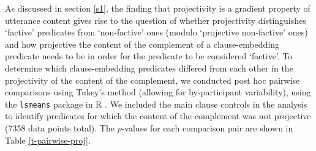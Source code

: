 \documentclass[11pt,fleqn]{article}
\newcommand{\6}{\mbox{$[\hspace*{-.6mm}[$}}
\newcommand{\9}{\mbox{$]\hspace*{-.6mm}]$}}
\begin{document}

As discussed in section \ref{s1}, the finding that projectivity is a gradient property of utterance content gives rise to the question of whether projectivity distinguishes `factive' predicates from `non-factive' ones (modulo `projective non-factive' ones) and how projective the content of the complement of a clause-embedding predicate needs to be in order for the predicate to be considered `factive'. To determine which clause-embedding predicates differed from each other in the projectivity of the content of the  complement, we conducted post hoc pairwise comparisons using Tukey's method (allowing for by-participant variability), using the \verb|lsmeans| package \citep{tukey} in R \citep{r}. We included the main clause controls in the analysis to identify predicates for which the content of the complement was not projective (7358 data points total). The $p$-values for each comparison pair are shown in Table \ref{t-pairwise-proj}. 
\end{document}
